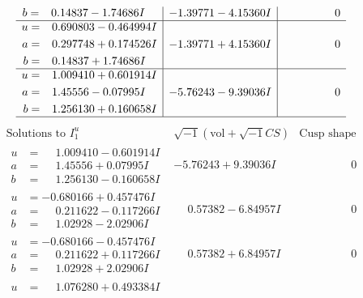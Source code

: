 \documentclass[1p]{elsarticle_modified}
\theoremstyle{definition}
\newcommand{\I}{\sqrt{-1}}
\begin{document}
$$\begin{array}{c|c|c}
\begin{aligned}
b &= \phantom{-}0.14837 - 1.74686 I\end{aligned}
 & -1.39771 - 4.15360 I & \phantom{-0.000000 } 0 \\ \hline\begin{aligned}
u &= \phantom{-}0.690803 - 0.464994 I \\
a &= \phantom{-}0.297748 + 0.174526 I \\
b &= \phantom{-}0.14837 + 1.74686 I\end{aligned}
 & -1.39771 + 4.15360 I & \phantom{-0.000000 } 0 \\ \hline\begin{aligned}
u &= \phantom{-}1.009410 + 0.601914 I \\
a &= \phantom{-}1.45556 - 0.07995 I \\
b &= \phantom{-}1.256130 + 0.160658 I\end{aligned}
 & -5.76243 - 9.39036 I & \phantom{-0.000000 } 0\\
 \hline 
 \end{array}$$\newpage$$\begin{array}{c|c|c}  
\text{Solutions to }I^u_{1}& \I (\text{vol} + \sqrt{-1}CS) & \text{Cusp shape}\\
 \hline 
\begin{aligned}
u &= \phantom{-}1.009410 - 0.601914 I \\
a &= \phantom{-}1.45556 + 0.07995 I \\
b &= \phantom{-}1.256130 - 0.160658 I\end{aligned}
 & -5.76243 + 9.39036 I & \phantom{-0.000000 } 0 \\ \hline\begin{aligned}
u &= -0.680166 + 0.457476 I \\
a &= \phantom{-}0.211622 - 0.117266 I \\
b &= \phantom{-}1.02928 - 2.02906 I\end{aligned}
 & \phantom{-}0.57382 - 6.84957 I & \phantom{-0.000000 } 0 \\ \hline\begin{aligned}
u &= -0.680166 - 0.457476 I \\
a &= \phantom{-}0.211622 + 0.117266 I \\
b &= \phantom{-}1.02928 + 2.02906 I\end{aligned}
 & \phantom{-}0.57382 + 6.84957 I & \phantom{-0.000000 } 0 \\ \hline\begin{aligned}
u &= \phantom{-}1.076280 + 0.493384 I \\

\end{aligned}
\end{array}$$
\end{document}
